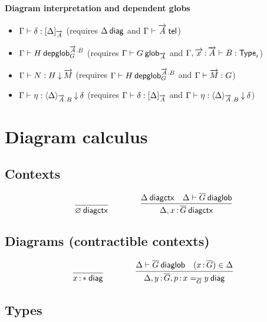 \paragraph{Diagram interpretation and dependent globs}

\begin{itemize}
\item ${\Gamma} \vdash {\delta} : {[ \Delta ]_{\overrightarrow{A}}}$
(requires $\Delta \: \mathsf{diag}$ and ${\Gamma} \vdash {\ensuremath{\overrightarrow{A}}} \: \mathsf{tel}$)
\item ${\Gamma} \vdash {H} \: \mathsf{depglob}^{\overrightarrow{A}.B}_{G}$
(requires ${\Gamma} \vdash {G} \: \mathsf{glob}_{\overrightarrow{A}}$ and ${\Gamma,\overrightarrow{x}\, {:}\, \overrightarrow{A}} \vdash {B} : {\mathsf{Type}_{i}}$)
\item ${\Gamma} \vdash {N} : {H}\mathbin{\downarrow}{\overrightarrow{M}}$
(requires ${\Gamma} \vdash {H} \: \mathsf{depglob}^{\overrightarrow{A}.B}_{G}$
and ${\Gamma} \vdash {\ensuremath{\overrightarrow{M}}} : {G}$)
\item ${\Gamma} \vdash {\eta} : {\langle \Delta \rangle_{\overrightarrow{A}.B}}\mathbin{\downarrow}{\delta}$
(requires ${\Gamma} \vdash {\delta} : {[ \Delta ]_{\overrightarrow{A}}}$
and ${\Gamma} \vdash {\eta} : {\langle \Delta \rangle_{\overrightarrow{A}.B}}\mathbin{\downarrow}{\delta}$)
\end{itemize}

\section{Diagram calculus}

\subsection{Contexts}

\begin{small}
  \[
  \infer{\wfdiagctx{\emptyctx}}{}
  \qquad\qquad
  \infer
  {\wfdiagctx{\Delta,\tptm{x}{\diag G}}}
  {\wfdiagctx{\Delta} & \wfdiaglob{\Delta}{\diag G}}\]
\end{small}

\subsection{Diagrams (contractible contexts)}


\begin{small}
  \[
  \infer{\wfdiag{\tptm{x}{\diagbase}}}{}
  \qquad\qquad
  \infer{\wfdiag{\Delta,\tptm{y}{\diag G},\tptm{p}{\homj{\diag{G}}{x}{y}}}}
  {\wfdiaglob{\Delta}{\diag G}
    & (\tptm{x}{\diag{G}}) \in \Delta}\]
\end{small}

\subsection{Types}

